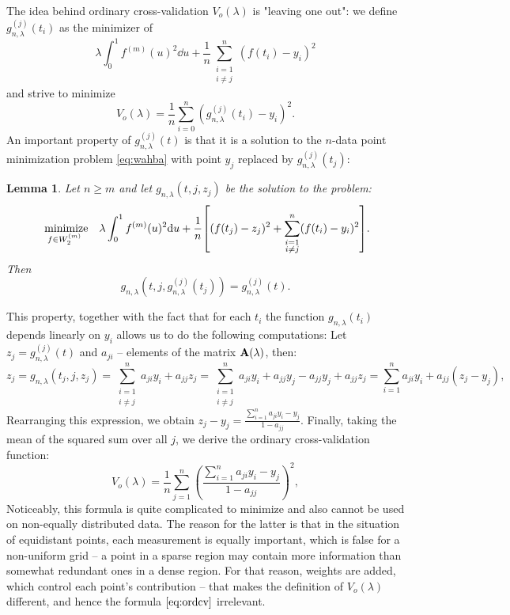 \documentclass[11pt,leqno]{book}
\theoremstyle{definition}
\theoremstyle{plain}
\newtheorem{lemma}[theorem]{Lemma}
\theoremstyle{definition}
\begin{document}
{The idea behind ordinary cross-validation $V_o(\lambda)$ is "leaving one out": we define $g_{n,\lambda}^{(j)}(t_i)$ as the minimizer of 
\begin{equation*}
    \lambda\int_{0}^{1}{f^{(m)}(u)^2\dd u} + \frac{1}{n}\sum_{\substack{i=1 \\ i\ne j}}^{n}({f(t_i) - {y}_i})^2 
    \label{eq:leaevoneout}
\end{equation*}
and strive to minimize
\[V_o(\lambda)=\frac{1}{n}\sum_{i=0}^n(g_{n,\lambda}^{(j)}(t_i)-{y}_i)^2.\]
An important property of $g_{n,\lambda}^{(j)}(t)$ is that it is a solution to the $n$-data point minimization problem \eqref{eq:wahba} with point ${y}_j$ replaced by $g_{n,\lambda}^{(j)}(t_j)$:
\begin{lemma} 
Let $n\geq m$ and let $g_{n,\lambda}(t, j, z_j)$ be the solution to the problem: \[ \underset {f\in W_2^{(m)}} {\textnormal{ minimize}} \quad
\lambda\int_{0}^{1}{f^{(m)}(u)^2\dd u} + \frac{1}{n}\qty[{(f(t_j) - z_j})^2+\sum_{\substack{i=1 \\ i\ne j}}^{n}({f(t_i) - {y}_i})^2]. 
\]
Then \[g_{n,\lambda}(t, j, g_{n,\lambda}^{(j)}(t_j))=g_{n,\lambda}^{(j)}(t).\]
\end{lemma}
\noindent This property, together with the fact that for each $t_i$ the function $g_{n,\lambda}(t_i)$ depends linearly on ${y}_i$ allows us to do the following computations: Let $z_j=g_{n,\lambda}^{(j)}(t)$ and $a_{ji}$ --  elements of the matrix $\vb{A}(\lambda)$, then:
\[
z_j = g_{n,\lambda}(t_j, j, z_j)=\sum_{\substack{i=1 \\ i\ne j}}^{n}a_{ji}y_i+a_{jj}z_j = \sum_{\substack{i=1 \\ i\ne j}}^{n}a_{ji}y_i + a_{jj}y_j-a_{jj}y_j+a_{jj}z_j=\sum_{i=1}^na_{ji}y_i+a_{jj}(z_j-y_{j}),
\]
Rearranging this expression, we obtain $z_j-y_j=\frac{\sum_{i=1}^na_{ji}y_i-y_j}{1-a_{jj}}$. Finally, taking the mean of the squared sum over all $j$, we derive the ordinary cross-validation function:
\begin{equation}
   V_o(\lambda) =
\frac{1}{n}\sum_{j=1}^n
\left(
\frac{\sum_{i=1}^na_{ji}{y}_i-{y}_j}{1-a_{jj}}
\right)^2,
\label{eq:ordcv}
\end{equation}
Noticeably, this formula is quite complicated to minimize and also cannot be used on non-equally distributed data. The reason for the latter is that in the situation of equidistant points, each measurement is equally important, which is false for a non-uniform grid -- a point in a sparse region may contain more information than somewhat redundant ones in a dense region. For that reason, weights are added, which control each point's contribution -- that makes the definition of $V_o(\lambda)$ different, and hence the formula $\eqref{eq:ordcv}$ irrelevant.

}
\end{document}
